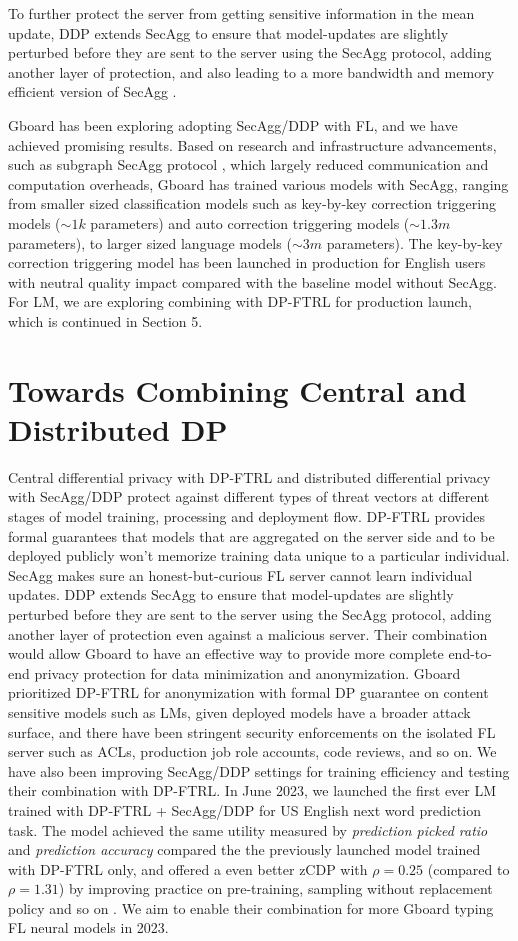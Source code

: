 \documentclass{article}
\begin{document}
To further protect the server from getting sensitive information in the mean update, DDP extends SecAgg to ensure that model-updates are slightly perturbed before they are sent to the server using the SecAgg protocol, adding another layer of protection, and also leading to a more bandwidth and memory efficient version of SecAgg \cite{ddpsecagg}.

Gboard has been exploring adopting SecAgg/DDP with FL, and we have achieved promising results. Based on research and infrastructure advancements, such as subgraph SecAgg protocol \cite{subgraphsecagg}, which largely reduced communication and computation overheads, Gboard has trained various models with SecAgg, ranging from smaller sized classification models such as key-by-key correction triggering models ($\sim1k$ parameters) and auto correction triggering models ($\sim1.3m$ parameters), to larger sized language models ($\sim3m$ parameters). The key-by-key correction triggering model has been launched in production for English users with neutral quality impact compared with the baseline model without SecAgg. For LM, we are exploring combining with DP-FTRL for production launch, which is continued in Section 5.

\section{Towards Combining Central and Distributed DP}

Central differential privacy with DP-FTRL and distributed differential privacy with SecAgg/DDP protect against different types of threat vectors at different stages of model training, processing and deployment flow. DP-FTRL provides formal guarantees that models that are aggregated on the server side and to be deployed publicly won't memorize training data unique to a particular individual. SecAgg makes sure an honest-but-curious FL server cannot learn individual updates. DDP extends SecAgg to ensure that model-updates are slightly perturbed before they are sent to the server using the SecAgg protocol, adding another layer of protection even against a malicious server. Their combination would allow Gboard to have an effective way to provide more complete end-to-end privacy protection for data minimization and anonymization. Gboard prioritized DP-FTRL for anonymization with formal DP guarantee on content sensitive models such as LMs, given deployed models have a broader attack surface, and there have been stringent security enforcements on the isolated FL server such as ACLs, production job role accounts, code reviews, and so on. We have also been improving SecAgg/DDP settings for training efficiency and testing their combination with DP-FTRL. In June 2023, we launched the first ever LM trained with DP-FTRL + SecAgg/DDP for US English next word prediction task. The model achieved the same utility measured by \textit{prediction picked ratio} and \textit{prediction accuracy} compared the the previously launched model trained with DP-FTRL only, and offered a even better zCDP with $\rho=0.25$ (compared to $\rho=1.31$) by improving practice on pre-training, sampling without replacement policy and so on \cite{gboardlmdpftrl}. We aim to enable their combination for more Gboard typing FL neural models in 2023. 
\end{document}

